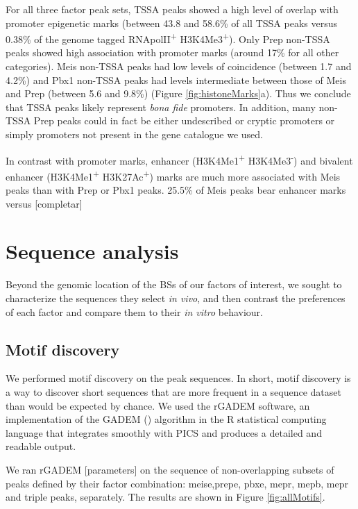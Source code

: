 For all three factor peak sets, \ac{TSSA} peaks showed a high level of overlap with promoter epigenetic marks (between 43.8 and 58.6\% of all \ac{TSSA} peaks versus 0.38\% of the genome tagged RNApolII\textsuperscript{+} H3K4Me3\textsuperscript{+}). Only Prep non-\ac{TSSA} peaks showed high association with promoter marks (around 17\% for all other categories). Meis non-\ac{TSSA} peaks had low levels of coincidence (between 1.7 and 4.2\%) and Pbx1 non-\ac{TSSA} peaks had levels intermediate between those of Meis and Prep (between 5.6 and 9.8\%) (Figure \ref{fig:histoneMarks}a). Thus we conclude that \ac{TSSA} peaks likely represent \textit{bona fide} promoters. In addition, many non-\ac{TSSA} Prep peaks could in fact be either undescribed or cryptic promoters or simply promoters not present in the gene catalogue we used.

In contrast with promoter marks, enhancer (H3K4Me1\textsuperscript{+} H3K4Me3\textsuperscript{-}) and bivalent enhancer (H3K4Me1\textsuperscript{+} H3K27Ac\textsuperscript{+}) marks are much more associated with Meis peaks than with Prep or Pbx1 peaks. 25.5\% of Meis peaks bear enhancer marks versus [completar]
 
\section{Sequence analysis}

Beyond the genomic location of the \acp{BS} of our factors of interest, we sought to characterize the sequences they select \textit{in vivo}, and then contrast the preferences of each factor and compare them to their \textit{in vitro} behaviour. 

\subsection{Motif discovery}

We performed motif discovery on the peak sequences. In short, motif discovery is a way to discover short sequences that are more frequent in a sequence dataset than would be expected by chance. We used the rGADEM software, an implementation of the GADEM (\cite{Li2009a}) algorithm in the R statistical computing language that integrates smoothly with \ac{PICS} and produces a detailed and readable output.

We ran rGADEM [parameters] on the sequence of non-overlapping subsets of peaks defined by their factor combination: \ac{meise},\ac{prepe}, \ac{pbxe}, \ac{mepr}, \ac{mepb}, \ac{mepr} and triple peaks, separately. The results are shown in Figure \ref{fig:allMotifs}.

